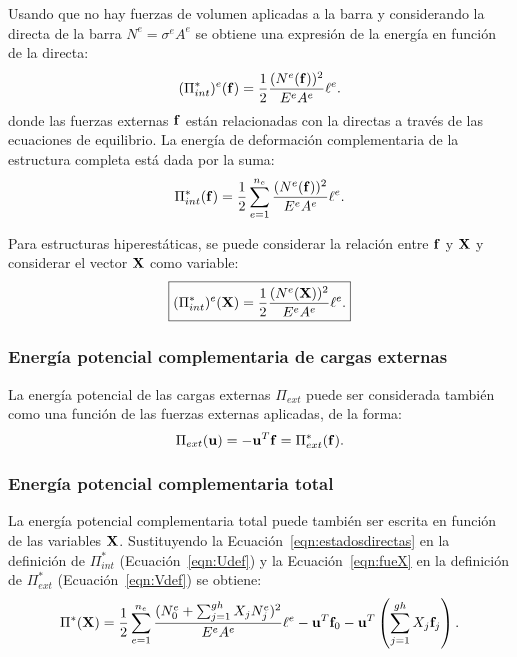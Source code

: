 Usando que no hay fuerzas de volumen aplicadas a la barra y considerando la directa de la barra $N^e = \sigma^e A^e$ se obtiene una expresión de la energía en función de la directa:
%
\begin{equation}
(\Pi_{int}^*)^e({\bf f}) = \frac{1}{2} \frac{(N^e ({\bf f}))^2}{E^e A^e} \ell^e.
\end{equation}
%
donde las fuerzas externas ${\bf f}$ están relacionadas con la directas a través de las ecuaciones de equilibrio. %
%
La energía de deformación complementaria de la estructura completa está dada por la suma:
%
\begin{equation}\label{eqn:Udef}
\Pi_{int}^*({\bf f}) =  \frac{1}{2} \sum_{e=1}^{n_e} \frac{(N^e ({\bf f}))^2}{E^e A^e} \ell^e.
\end{equation}

Para estructuras hiperestáticas, se puede considerar la relación entre ${\bf f}$ y ${\bf X}$ y considerar el vector ${\bf X}$ como variable:
%
\begin{equation}
\boxed{
(\Pi_{int}^*)^e({\bf X}) = \frac{1}{2} \frac{(N^e ({\bf X}))^2}{E^e A^e} \ell^e.
}
\end{equation}

\subsubsection{Energía potencial complementaria de cargas externas}
La energía potencial de las cargas externas $\Pi_{ext}$ puede ser considerada también como una función de las fuerzas externas aplicadas, de la forma:
%
\begin{equation}\label{eqn:Vdef}
\Pi_{ext}({\bf u}) = -{\bf u}^T {\bf f} = \Pi_{ext}^*({\bf f}).
\end{equation}





\subsubsection{Energía potencial complementaria total}

La energía potencial complementaria total puede también ser escrita en función de las variables ${\bf X}$. %
%
Sustituyendo la Ecuación~\eqref{eqn:estadosdirectas} en la definición de $\Pi_{int}^*$ (Ecuación~\eqref{eqn:Udef})  y la Ecuación~\eqref{eqn:fueX} en la definición de $\Pi_{ext}^*$ (Ecuación~\eqref{eqn:Vdef}) se obtiene:
%
\begin{equation}
\Pi^* ({\bf X}) = \frac{1}{2}  \sum_{e=1}^{n_e} \frac{(N_0^e + \sum_{j=1}^{gh} X_j N_j^e)^2}{E^e A^e} \ell^e - {\bf u}^T {\bf f}_0 - {\bf u}^T \left( \sum_{j=1}^{gh} X_j {\bf f}_j \right).
\end{equation}


